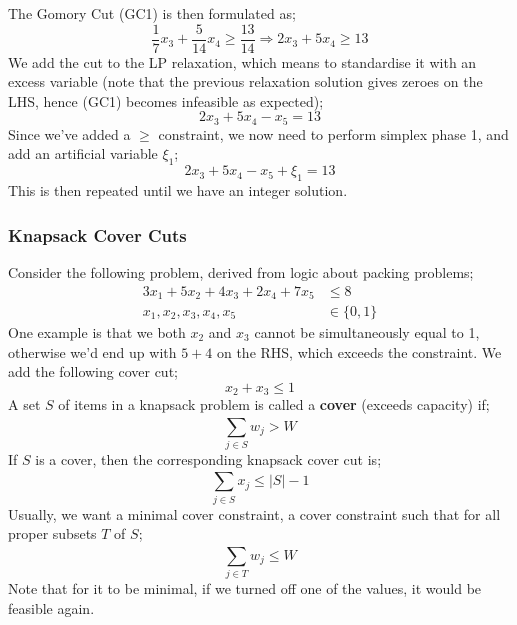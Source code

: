 \documentclass[a4paper, 12pt]{article}
\newcommand{\summation}[2]{\sum\limits_{#1}^{#2}}
\begin{document}
                The Gomory Cut (GC1) is then formulated as;
                $$\frac{1}{7}x_3 + \frac{5}{14}x_4 \geq \frac{13}{14} \Rightarrow 2x_3 + 5x_4 \geq 13$$
                We add the cut to the LP relaxation, which means to standardise it with an excess variable (note that the previous relaxation solution gives zeroes on the LHS, hence (GC1) becomes infeasible as expected);
                $$2x_3 + 5x_4 - x_5 = 13$$
                Since we've added a $\geq$ constraint, we now need to perform simplex phase 1, and add an artificial variable $\xi_1$;
                $$2x_3 + 5x_4 - x_5 + \xi_1 = 13$$
                This is then repeated until we have an integer solution.
            \subsubsection*{Knapsack Cover Cuts}
                Consider the following problem, derived from logic about packing problems;
                \begin{align*}
                    3x_1 + 5x_2 + 4x_3 + 2x_4 + 7x_5 & \leq 8 \\
                    x_1, x_2, x_3, x_4, x_5 & \in \{0, 1\}
                \end{align*}
                One example is that we both $x_2$ and $x_3$ cannot be simultaneously equal to 1, otherwise we'd end up with $5 + 4$ on the RHS, which exceeds the constraint.
                We add the following cover cut;
                $$x_2 + x_3 \leq 1$$
                A set $S$ of items in a knapsack problem is called a \textbf{cover} (exceeds capacity) if;
                $$\summation{j \in S}{} w_j > W$$
                If $S$ is a cover, then the corresponding knapsack cover cut is;
                $$\summation{j \in S}{} x_j \leq | S | - 1$$
                Usually, we want a minimal cover constraint, a cover constraint such that for all proper subsets $T$ of $S$;
                $$\summation{j \in T}{} w_j \leq W$$
                Note that for it to be minimal, if we turned off one of the values, it would be feasible again.
\end{document}
